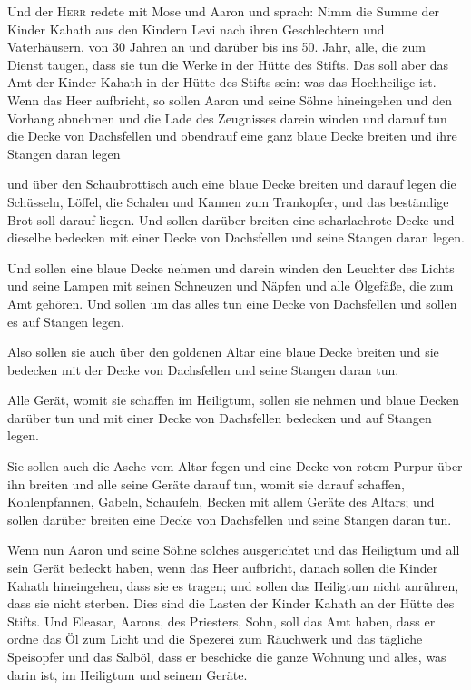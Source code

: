 Und der \textsc{Herr} redete mit Mose und Aaron und
sprach:  Nimm die Summe der Kinder Kahath aus den Kindern
Levi nach ihren Geschlechtern und Vaterhäusern,  von 30
Jahren an und darüber bis ins 50. Jahr, alle, die zum Dienst taugen,
dass sie tun die Werke in der Hütte des Stifts.  Das soll
aber das Amt der Kinder Kahath in der Hütte des Stifts sein: was das
Hochheilige ist.  Wenn das Heer aufbricht, so sollen Aaron
und seine Söhne hineingehen und den Vorhang abnehmen und die Lade des
Zeugnisses darein winden  und darauf tun die Decke von
Dachsfellen und obendrauf eine ganz blaue Decke breiten und ihre Stangen
daran legen

 und über den Schaubrottisch auch eine blaue Decke breiten
und darauf legen die Schüsseln, Löffel, die Schalen und Kannen zum
Trankopfer, und das beständige Brot soll darauf liegen. 
Und sollen darüber breiten eine scharlachrote Decke und dieselbe
bedecken mit einer Decke von Dachsfellen und seine Stangen daran legen.

 Und sollen eine blaue Decke nehmen und darein winden den
Leuchter des Lichts und seine Lampen mit seinen Schneuzen und Näpfen und
alle Ölgefäße, die zum Amt gehören.  Und sollen um das
alles tun eine Decke von Dachsfellen und sollen es auf Stangen legen.

 Also sollen sie auch über den goldenen Altar eine blaue
Decke breiten und sie bedecken mit der Decke von Dachsfellen und seine
Stangen daran tun.

 Alle Gerät, womit sie schaffen im Heiligtum, sollen sie
nehmen und blaue Decken darüber tun und mit einer Decke von Dachsfellen
bedecken und auf Stangen legen.

 Sie sollen auch die Asche vom Altar fegen und eine Decke
von rotem Purpur über ihn breiten  und alle seine Geräte
darauf tun, womit sie darauf schaffen, Kohlenpfannen, Gabeln, Schaufeln,
Becken mit allem Geräte des Altars; und sollen darüber breiten eine
Decke von Dachsfellen und seine Stangen daran tun.

 Wenn nun Aaron und seine Söhne solches ausgerichtet und
das Heiligtum und all sein Gerät bedeckt haben, wenn das Heer aufbricht,
danach sollen die Kinder Kahath hineingehen, dass sie es tragen; und
sollen das Heiligtum nicht anrühren, dass sie nicht sterben. Dies sind
die Lasten der Kinder Kahath an der Hütte des Stifts. 
Und Eleasar, Aarons, des Priesters, Sohn, soll das Amt haben, dass er
ordne das Öl zum Licht und die Spezerei zum Räuchwerk und das tägliche
Speisopfer und das Salböl, dass er beschicke die ganze Wohnung und
alles, was darin ist, im Heiligtum und seinem Geräte.


